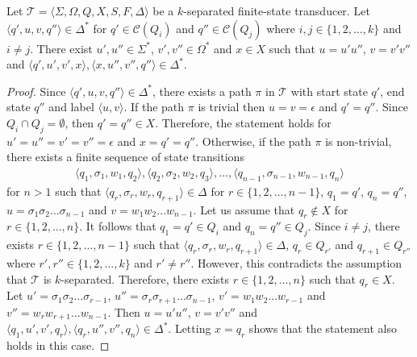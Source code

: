 \begin{proposition}
  Let $\mathcal{T} = \langle \Sigma, \Omega, Q, X, S, F, \Delta \rangle$ be a
  $k$-separated finite-state transducer. Let $\langle q', u, v, q'' \rangle
  \in \Delta^*$ for $q' \in \mathcal{C}(Q_i)$ and $q'' \in \mathcal{C}(Q_j)$ where
  $i, j \in \{ 1, 2, \ldots, k \}$ and $i \neq j$. There exist $u', u'' \in
  \Sigma^*$, $v', v'' \in \Omega^*$ and $x \in X$ such that $u = u'u''$, $v = v'v''$
  and $\langle q', u', v', x \rangle, \langle x, u'', v'', q'' \rangle \in \Delta^*$.
\end{proposition}

\begin{proof}
  Since $\langle q', u, v, q'' \rangle \in \Delta^*$, there exists a path $\pi$
  in $\mathcal{T}$ with start state $q'$, end state $q''$ and label $\langle
    u, v \rangle$. If the path $\pi$ is trivial then $u = v = \epsilon$ and $q' =
    q''$. Since $Q_i \cap Q_j = \emptyset$, then $q' = q'' \in X$. Therefore, the
  statement holds for $u' = u'' = v' = v'' = \epsilon$ and $x = q' = q''$.
  Otherwise, if the path $\pi$ is non-trivial, there exists a finite sequence
  of state transitions
  \begin{align*}
    \langle q_1, \sigma_1, w_1, q_2 \rangle, \langle q_2, \sigma_2, w_2,
    q_3 \rangle, \ldots, \langle q_{n-1}, \sigma_{n-1}, w_{n-1}, q_n
    \rangle
  \end{align*}
  for $n > 1$ such that $\langle q_r, \sigma_r, w_r, q_{r+1} \rangle \in
    \Delta$ for $r \in \{ 1, 2, \ldots, n-1 \}$, $q_1 = q'$, $q_n = q''$, $u =
    \sigma_1\sigma_2\ldots\sigma_{n-1}$ and $v = w_1 w_2 \ldots w_{n-1}$. Let us
  assume that $q_r \not\in X$ for $r \in \{ 1, 2, \ldots, n \}$. It follows
  that $q_1 = q' \in Q_i$ and $q_n = q'' \in Q_j$. Since $i \neq j$, there
  exists $r \in \{ 1, 2, \ldots, n-1 \}$ such that $\langle q_r, \sigma_r,
    w_r, q_{r+1} \rangle \in \Delta$, $q_r \in Q_{r'}$ and $q_{r+1} \in Q_{r''}$
  where $r', r'' \in \{ 1, 2, \ldots, k \}$ and $r' \neq r''$. However, this
  contradicts the assumption that $\mathcal{T}$ is $k$-separated. Therefore,
  there exists $r \in \{ 1, 2, \ldots, n \}$ such that $q_r \in X$. Let $u' =
    \sigma_1 \sigma_2 \ldots \sigma_{r-1}$, $u'' = \sigma_r \sigma_{r+1} \ldots
    \sigma_{n-1}$, $v' = w_1 w_2 \ldots w_{r-1}$ and $v'' = w_r w_{r+1} \ldots
    w_{n-1}$. Then $u = u'u''$, $v = v'v''$ and $\langle q_1, u', v', q_r
    \rangle, \langle q_r, u'', v'', q_n \rangle \in \Delta^*$. Letting $x = q_r$
  shows that the statement also holds in this case.
\end{proof}

